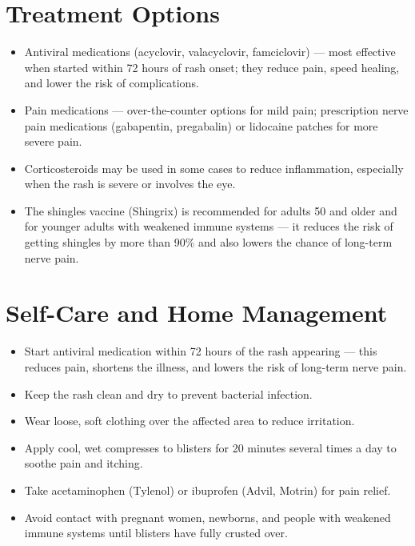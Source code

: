 \section*{Treatment Options}
\begin{itemize}
  \item Antiviral medications (acyclovir, valacyclovir, famciclovir) — most effective when started within 72 hours of rash onset; they reduce pain, speed healing, and lower the risk of complications.
  \item Pain medications — over-the-counter options for mild pain; prescription nerve pain medications (gabapentin, pregabalin) or lidocaine patches for more severe pain.
  \item Corticosteroids may be used in some cases to reduce inflammation, especially when the rash is severe or involves the eye.
  \item The shingles vaccine (Shingrix) is recommended for adults 50 and older and for younger adults with weakened immune systems — it reduces the risk of getting shingles by more than 90\% and also lowers the chance of long-term nerve pain.
\end{itemize}

\section*{Self-Care and Home Management}
\begin{itemize}
  \item Start antiviral medication within 72 hours of the rash appearing — this reduces pain, shortens the illness, and lowers the risk of long-term nerve pain.
  \item Keep the rash clean and dry to prevent bacterial infection.
  \item Wear loose, soft clothing over the affected area to reduce irritation.
  \item Apply cool, wet compresses to blisters for 20 minutes several times a day to soothe pain and itching.
  \item Take acetaminophen (Tylenol) or ibuprofen (Advil, Motrin) for pain relief.
  \item Avoid contact with pregnant women, newborns, and people with weakened immune systems until blisters have fully crusted over.
\end{itemize}

